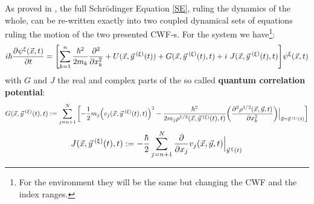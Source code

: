 \documentclass[11pt, a4paper]{article} %
\begin{document}
As proved in \cite{GJ}, the full Schrödinger Equation \eqref{SE}, ruling the dynamics of the whole, can be re-written exactly into two coupled dynamical sets of equations ruling the motion of the two presented CWF-s. For the system we have\footnote{For the environment they will be the same but changing the CWF and the index ranges.}:\vspace{-0.2cm}
\begin{equation}\label{SE.GJ}
i \hbar \pdv{\psi^\xi (\vec{x},t)}{t} = \qty[\sum_{k=1}^n\frac{\hbar^2}{2m_k} \pdv[2]{}{x_k} +  U(\vec{x}, \vec{y}^{\: (\xi)}(t)) + G(\vec{x}, \vec{y}^{\: (\xi)}(t),t)+i\ J(\vec{x}, \vec{y}^{\: (\xi)}(t),t)] \psi^\xi (\vec{x},t)
\end{equation}
with $G$ and $J$ the real and complex parts of the so called {\bf quantum correlation potential}:
\begin{equation}\label{G.Bohm}
G(\vec{x},\vec{y}^{\:(\xi)}(t),t):=\sum_{j=n+1}^N\qty[-\frac{1}{2}m_j\qty(v_j(\vec{x},\vec{y}^{\: (\xi)}(t),t))^2-\frac{\hbar^2}{2m_j\rho^{1/2}(\vec{x},\vec{y}^{\:(\xi)}(t),t)}\qty(\pdv[2]{\rho^{1/2}(\vec{x},\vec{y},t)}{x_k})\Big\rvert_{\vec{y}=\vec{y}^{\:(\xi)}(t)} ]\vspace{-0.2cm}
\end{equation}
\begin{equation}\label{J.Bohm}
J(\vec{x},\vec{y}^{\:(\xi)}(t),t):=-\frac{\hbar}{2}\sum_{j=n+1}^N\pdv{}{x_j}v_j(\vec{x},\vec{y},t)\Big\rvert_{\vec{y}^{\, \xi}(t)}
\end{equation}
\end{document}
